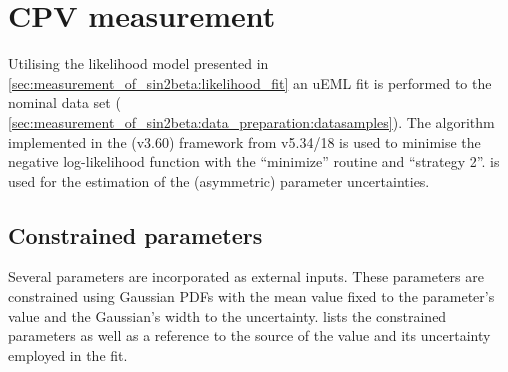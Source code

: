 
\section{CPV measurement}
\label{sec:measurement_of_sin2beta:cpv_measurement}

Utilising the likelihood model presented in
\cref{sec:measurement_of_sin2beta:likelihood_fit} an \acf{uEML} fit is performed
to the nominal data set (\cf
\cref{sec:measurement_of_sin2beta:data_preparation:datasamples}).  The
\MinuitTwo algorithm implemented in the \RooFit (v3.60) framework from \ROOT
v5.34/18 is used to minimise the negative log-likelihood function with the
\enquote{minimize} routine and \enquote{strategy 2}. \Minos is used for the
estimation of the (asymmetric) parameter uncertainties.

\subsection{Constrained parameters}
\label{sec:measurement_of_sin2beta:cpv_measurement:constrained_parameters}

Several parameters are incorporated as external inputs. These parameters are
constrained using Gaussian \acp{PDF} with the mean value fixed to the parameter's
value and the Gaussian's width to the uncertainty.
 lists
the constrained parameters as well as a reference to the source of the value and
its uncertainty employed in the fit.

